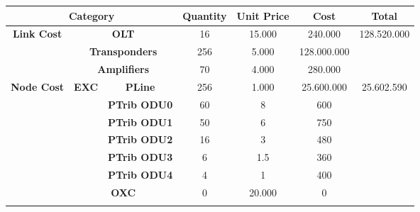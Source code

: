 \begin{table}[H]
\centering
\label{opaque_medium_traffic_protec}
\begin{tabular}{|c|c|c|c|c|c|c|}
\hline
\multicolumn{3}{|c|}{\textbf{Category}}                                                   & \textbf{Quantity} & \textbf{Unit Price} & \textbf{Cost} & \textbf{Total}               \\ \hline
\multirow{3}{*}{\textbf{Link Cost}} & \multicolumn{2}{c|}{\textbf{OLT}}                   & 16                & 15.000              & 240.000       & \multirow{3}{*}{128.520.000} \\ \cline{2-6}
                                    & \multicolumn{2}{c|}{\textbf{Transponders}}          & 256               & 5.000               & 128.000.000   &                              \\ \cline{2-6}
                                    & \multicolumn{2}{c|}{\textbf{Amplifiers}}            & 70                & 4.000               & 280.000       &                              \\ \hline
\multirow{8}{*}{\textbf{Node Cost}} & \multirow{6}{*}{\textbf{EXC}} & \textbf{PLine}      & 256               & 1.000               & 25.600.000    & \multirow{8}{*}{25.602.590}  \\ \cline{3-6}
                                    &                               & \textbf{PTrib ODU0} & 60                & 8                   & 600           &                              \\ \cline{3-6}
                                    &                               & \textbf{PTrib ODU1} & 50                & 6                   & 750           &                              \\ \cline{3-6}
                                    &                               & \textbf{PTrib ODU2} & 16                & 3                   & 480           &                              \\ \cline{3-6}
                                    &                               & \textbf{PTrib ODU3} & 6                 & 1.5                 & 360           &                              \\ \cline{3-6}
                                    &                               & \textbf{PTrib ODU4} & 4                 & 1                   & 400           &                              \\ \cline{2-6}
                                    & \multicolumn{2}{c|}{\textbf{OXC}}                   & 0                 & 20.000              & 0             &                              \\ \cline{2-6}

\end{tabular}
\end{table}

